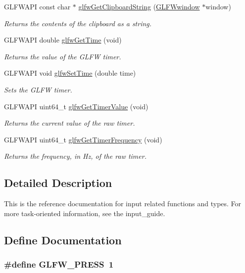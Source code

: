 \begin{CompactItemize}
GLFWAPI const char $\ast$ \hyperlink{group__input_g3ac90c8bbaf0b46063bb02b574f3b6f7}{glfwGetClipboardString} (\hyperlink{group__window_g3c96d80d363e67d13a41b5d1821f3242}{GLFWwindow} $\ast$window)
\begin{CompactList}\small\item\em Returns the contents of the clipboard as a string. \item\end{CompactList}\item 
GLFWAPI double \hyperlink{group__input_g03d4a1039b8662c71eeb40beea8cb622}{glfwGetTime} (void)
\begin{CompactList}\small\item\em Returns the value of the GLFW timer. \item\end{CompactList}\item 
GLFWAPI void \hyperlink{group__input_g94360a3628a09f32708f83cc3fa48590}{glfwSetTime} (double time)
\begin{CompactList}\small\item\em Sets the GLFW timer. \item\end{CompactList}\item 
GLFWAPI uint64\_\-t \hyperlink{group__input_ga00c3e32227eb70b3968fca0bfe4ae26}{glfwGetTimerValue} (void)
\begin{CompactList}\small\item\em Returns the current value of the raw timer. \item\end{CompactList}\item 
GLFWAPI uint64\_\-t \hyperlink{group__input_ga92d10b10013372778efbf6367714371}{glfwGetTimerFrequency} (void)
\begin{CompactList}\small\item\em Returns the frequency, in Hz, of the raw timer. \item\end{CompactList}\end{CompactItemize}


\subsection{Detailed Description}
This is the reference documentation for input related functions and types. For more task-oriented information, see the input\_\-guide. 

\subsection{Define Documentation}
\hypertarget{group__input_g2485743d0b59df3791c45951c4195265}{
\subsubsection[GLFW\_\-PRESS]{\setlength{\rightskip}{0pt plus 5cm}\#define GLFW\_\-PRESS~1}}
\label{group__input_g2485743d0b59df3791c45951c4195265}



